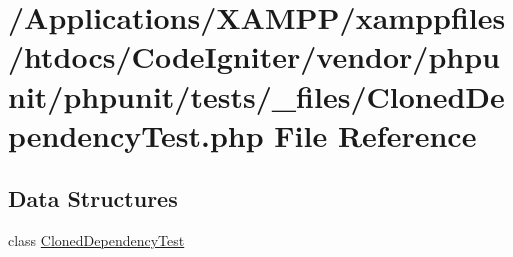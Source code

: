 \hypertarget{_cloned_dependency_test_8php}{}\section{/\+Applications/\+X\+A\+M\+P\+P/xamppfiles/htdocs/\+Code\+Igniter/vendor/phpunit/phpunit/tests/\+\_\+files/\+Cloned\+Dependency\+Test.php File Reference}
\label{_cloned_dependency_test_8php}
\subsection*{Data Structures}
\begin{DoxyCompactItemize}
\item 
class \mbox{\hyperlink{class_cloned_dependency_test}{Cloned\+Dependency\+Test}}
\end{DoxyCompactItemize}
